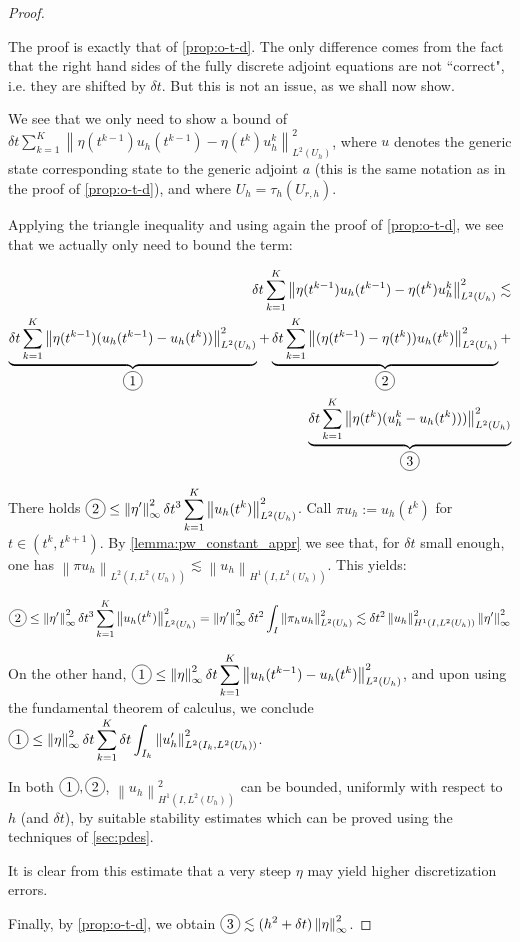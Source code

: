 \documentclass[english,a4paper,10pt,oneside]{scrbook}	%
\theoremstyle{break}
\newenvironment{mproof}[1][\proofname]{%
  \begin{proof}[#1]$ $\par\nobreak\ignorespaces
}{%
  \end{proof}
}
\renewcommand*{\proofname}{Proof}
\theoremstyle{remark}
\newcommand{\ds}{\displaystyle}
\newcommand{\norm}[1]{\left\lVert#1\right\rVert}
\newcommand*\circled[1]{\tikz[baseline=(char.base)]{
            \node[shape=circle,draw,inner sep=2pt] (char) {#1};}}
\begin{document}
\begin{mproof}
The proof is exactly that of \cref{prop:o-t-d}. The only difference comes from the fact that the right hand sides of the fully discrete adjoint equations are not ``correct", i.e. they are shifted by $\delta t$. But this is not an issue, as we shall now show. 

We see that we only need to show a bound of  $\delta t \sum_{k=1}^{K}\norm{\eta(t^{k-1})u_h(t^{k-1})-\eta(t^k)u_h^{k}}^2_{L^2(U_h)}$, where $u$ denotes the generic state corresponding state to the generic adjoint $a$ (this is the same notation as in the proof of \cref{prop:o-t-d}), and where $U_h=\tau_h(U_{r,h})$.

Applying the triangle inequality and using again the proof of \cref{prop:o-t-d}, we see that we actually only need to bound the term:

\begin{align*}
\delta t \sum_{k=1}^{K}\norm{\eta(t^{k-1})u_h(t^{k-1})-\eta(t^k)u_h^k}^2_{L^2(U_h)}\lesssim\\
\underbrace{\delta t \sum_{k=1}^{K}\norm{\eta(t^{k-1})(u_h(t^{k-1})-u_h(t^{k}))}^2_{L^2(U_h)}}_{\circled{1}}+
\underbrace{\delta t \sum_{k=1}^{K}\norm{(\eta(t^{k-1})-\eta(t^k))u_h(t^{k})}^2_{L^2(U_h)}}_{\circled{2}}+\\
\underbrace{\delta t \sum_{k=1}^{K}\norm{\eta(t^k)(u_h^k-u_h(t^k)))}^2_{L^2(U_h)}}_{\circled{3}}
\end{align*}

There holds $\ds  \circled{2} \leq \norm{\eta'}_\infty^2 \delta t^3 \sum_{k=1}^{K}\norm{u_h(t^{k})}^2_{L^2(U_h)}$. Call $\pi u_h := u_h(t^{k})$ for $t \in (t^k, t^{k+1})$. By \cref{lemma:pw_constant_appr} we see that, for $\delta t $ small enough, one has $\norm{\pi u_h}_{L^2(I, L^2(U_h))} \lesssim \norm{u_h}_{H^1(I,L^2(U_h))}$. This yields:

\begin{align*}
	 \ds  \circled{2}\leq \norm{\eta'}_\infty^2 \delta t^3 \sum_{k=1}^{K}\norm{u_h(t^{k})}^2_{L^2(U_h)}  = \norm{\eta'}_\infty^2 \delta t^2 \int_I \norm{\pi_h u_h}^2_{L^2(U_h)}\lesssim \delta t^2 \norm{u_h}_{H^1(I,L^2(U_h))}^2 \norm{\eta'}_\infty ^2
\end{align*}

On the other hand,  $\ds  \circled{1} \leq \norm{\eta}_\infty^2 \delta t \sum_{k=1}^{K}\norm{u_h(t^{k-1})-u_h(t^{k})}^2_{L^2(U_h)}$, and upon using the fundamental theorem of calculus, we conclude $\ds \circled{1} \leq \norm{\eta}_\infty^2 \delta t \sum_{k=1}^{K} \delta t \int_{I_k}\norm{u_h'}_{L^2(I_k , L^2(U_h))}^2$.

In both $\circled{1},\circled{2}$, $\norm{u_h}_{H^1(I,L^2(U_h))}^2$ can be bounded, uniformly with respect to $h$ (and $\delta t$), by suitable stability estimates which can be proved using the techniques of \cref{sec:pdes}.

It is clear from this estimate that a very steep $\eta$ may yield higher discretization errors.

Finally, by \cref{prop:o-t-d}, we obtain $\ds \circled{3} \lesssim (h^2+\delta t)\norm{\eta}_\infty^2 $.
\end{mproof}
\end{document}
